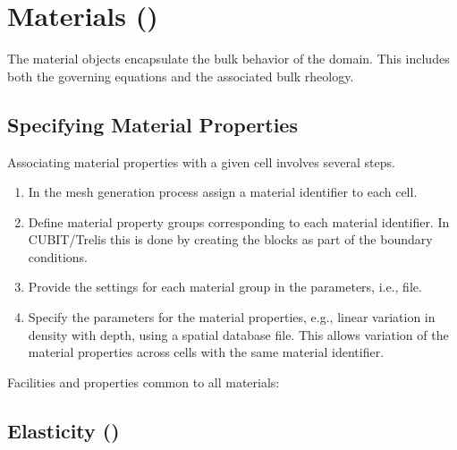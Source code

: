 \section{Materials (\protect{})}
\label{sec:materials}

The material objects encapsulate the bulk behavior of the domain. This
includes both the governing equations and the associated bulk rheology.

\subsection{Specifying Material Properties}

Associating material properties with a given cell involves several
steps. 
\begin{enumerate}
\item In the mesh generation process assign a material identifier to each
cell.
\item Define material property groups corresponding to each material
  identifier. In CUBIT/Trelis this is done by creating the blocks as
  part of the boundary conditions.
\item Provide the settings for each material group in the parameters,
  i.e.,  file.
\item Specify the parameters for the material properties, e.g., linear
  variation in density with depth, using a spatial database file. This
  allows variation of the material properties across cells with the
  same material identifier.
\end{enumerate}

Facilities and properties common to all materials:
\begin{inventory}
\end{inventory}


\subsection{Elasticity (\protect{})}


